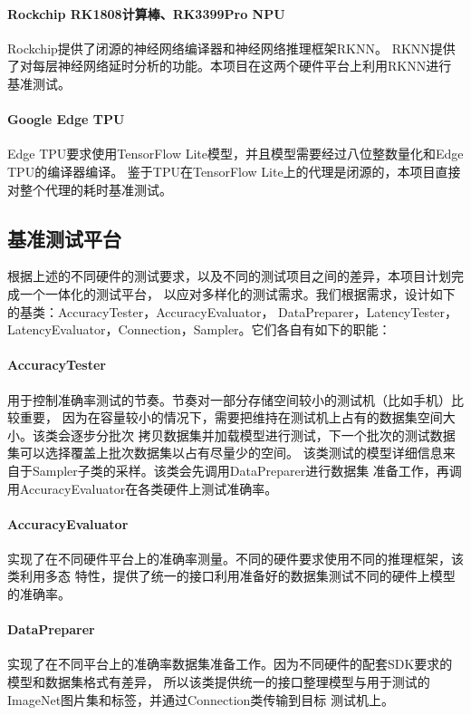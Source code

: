 \paragraph{Rockchip RK1808计算棒、RK3399Pro NPU}
Rockchip提供了闭源的神经网络编译器和神经网络推理框架RKNN。
RKNN提供了对每层神经网络延时分析的功能。本项目在这两个硬件平台上利用RKNN进行基准测试。

\paragraph{Google Edge TPU}
Edge TPU要求使用TensorFlow Lite模型，并且模型需要经过八位整数量化和Edge TPU的编译器编译。
鉴于TPU在TensorFlow Lite上的代理是闭源的，本项目直接对整个代理的耗时基准测试。

\subsection{基准测试平台}
根据上述的不同硬件的测试要求，以及不同的测试项目之间的差异，本项目计划完成一个一体化的测试平台，
以应对多样化的测试需求。我们根据需求，设计如下的基类：AccuracyTester，AccuracyEvaluator，
DataPreparer，LatencyTester，LatencyEvaluator，Connection，Sampler。它们各自有如下的职能：

\paragraph{AccuracyTester}
用于控制准确率测试的节奏。节奏对一部分存储空间较小的测试机（比如手机）比较重要，
因为在容量较小的情况下，需要把维持在测试机上占有的数据集空间大小。该类会逐步分批次
拷贝数据集并加载模型进行测试，下一个批次的测试数据集可以选择覆盖上批次数据集以占有尽量少的空间。
该类测试的模型详细信息来自于Sampler子类的采样。该类会先调用DataPreparer进行数据集
准备工作，再调用AccuracyEvaluator在各类硬件上测试准确率。

\paragraph{AccuracyEvaluator}
实现了在不同硬件平台上的准确率测量。不同的硬件要求使用不同的推理框架，该类利用多态
特性，提供了统一的接口利用准备好的数据集测试不同的硬件上模型的准确率。

\paragraph{DataPreparer}
实现了在不同平台上的准确率数据集准备工作。因为不同硬件的配套SDK要求的模型和数据集格式有差异，
所以该类提供统一的接口整理模型与用于测试的ImageNet图片集和标签，并通过Connection类传输到目标
测试机上。

